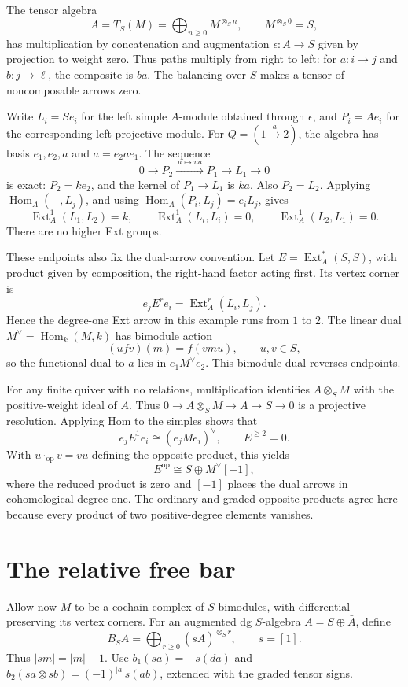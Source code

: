 The tensor algebra
\[
 A=T_S(M)=\bigoplus_{n\ge0}M^{\otimes_S n},\qquad M^{\otimes_S0}=S,
\]
has multiplication by concatenation and augmentation $\epsilon:A\to S$ given by projection to weight zero.
Thus paths multiply from right to left: for $a:i\to j$ and $b:j\to\ell$, the composite is $ba$.
The balancing over $S$ makes a tensor of noncomposable arrows zero.

Write $L_i=Se_i$ for the left simple $A$-module obtained through $\epsilon$, and $P_i=Ae_i$ for the corresponding left projective module.
For $Q=(1\xrightarrow{a}2)$, the algebra has basis $e_1,e_2,a$ and $a=e_2ae_1$.
The sequence
\[
 0\longrightarrow P_2\xrightarrow{\,u\mapsto ua\,}P_1
 \longrightarrow L_1\longrightarrow0
\]
is exact: $P_2=ke_2$, and the kernel of $P_1\to L_1$ is $ka$.
Also $P_2=L_2$.
Applying $\operatorname{Hom}_A(-,L_j)$, and using
$\operatorname{Hom}_A(P_i,L_j)=e_iL_j$, gives
\[
 \operatorname{Ext}^1_A(L_1,L_2)=k,\qquad
 \operatorname{Ext}^1_A(L_i,L_i)=0,\qquad
 \operatorname{Ext}^1_A(L_2,L_1)=0.
\]
There are no higher Ext groups.

These endpoints also fix the dual-arrow convention.
Let $E=\operatorname{Ext}^*_A(S,S)$, with product given by composition, the right-hand factor acting first.
Its vertex corner is
\[
 e_jE^re_i=\operatorname{Ext}^r_A(L_i,L_j).
\]
Hence the degree-one Ext arrow in this example runs from $1$ to $2$.
The linear dual $M^\vee=\operatorname{Hom}_k(M,k)$ has bimodule action
\[
 (u f v)(m)=f(vmu),\qquad u,v\in S,
\]
so the functional dual to $a$ lies in $e_1M^\vee e_2$.
This bimodule dual reverses endpoints.

For any finite quiver with no relations, multiplication identifies $A\otimes_S M$ with the positive-weight ideal of $A$.
Thus $0\to A\otimes_S M\to A\to S\to0$ is a projective resolution.
Applying Hom to the simples shows that
\[
 e_jE^1e_i\cong(e_jMe_i)^\vee,\qquad E^{\ge2}=0.
\]
With $u\cdot_{\mathrm{op}}v=vu$ defining the opposite product, this yields
\[
 E^{\mathrm{op}}\cong S\oplus M^\vee[-1],
\]
where the reduced product is zero and $[-1]$ places the dual arrows in cohomological degree one.
The ordinary and graded opposite products agree here because every product of two positive-degree elements vanishes.

\section{The relative free bar}

Allow now $M$ to be a cochain complex of $S$-bimodules, with differential preserving its vertex corners.
For an augmented dg $S$-algebra $A=S\oplus\bar A$, define
\[
 B_SA=\bigoplus_{r\ge0}(s\bar A)^{\otimes_S r},\qquad s=[1].
\]
Thus $|sm|=|m|-1$.
Use $b_1(sa)=-s(da)$ and $b_2(sa\otimes sb)=(-1)^{|a|}s(ab)$, extended with the graded tensor signs.

